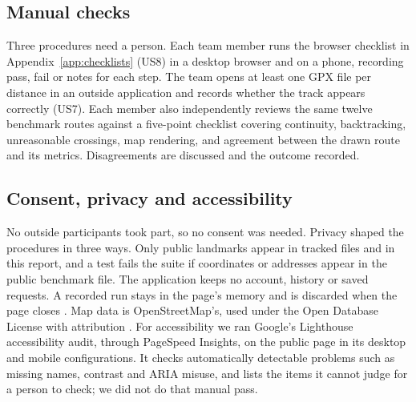 \subsection{Manual checks}
Three procedures need a person. Each team member runs the browser checklist
in Appendix~\ref{app:checklists} (US8) in a desktop browser and on a phone,
recording pass, fail or notes for each step. The team opens at least one GPX
file per distance in an outside application and records whether the track
appears correctly (US7). Each member also independently reviews the same
twelve benchmark routes against a five-point checklist covering continuity,
backtracking, unreasonable crossings, map rendering, and agreement between
the drawn route and its metrics. Disagreements are discussed and the outcome
recorded.

\subsection{Consent, privacy and accessibility}
No outside participants took part, so no consent was needed. Privacy shaped
the procedures in three ways. Only public landmarks appear in tracked files
and in this report, and a test fails the suite if coordinates or addresses
appear in the public benchmark file. The application keeps no account,
history or saved requests. A recorded run stays in the page's memory and is
discarded when the page closes \citep{w3c2026geolocation}. Map data is
OpenStreetMap's, used under the Open Database License with attribution
\citep{osm2026copyright}. For accessibility we ran Google's Lighthouse
accessibility audit, through PageSpeed Insights, on the public page in its
desktop and mobile configurations. It checks automatically detectable
problems such as missing names, contrast and ARIA misuse, and lists the
items it cannot judge for a person to check; we did not do that manual
pass.
